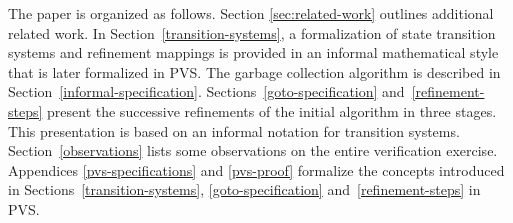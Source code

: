The paper is organized as follows.
Section \ref{sec:related-work} 
outlines additional related work.
In  Section~\ref{transition-systems},  a    formalization of state
transition  systems and  refinement mappings  is  provided in  an informal
mathematical style that  is  later formalized  in  PVS.  The garbage
collection algorithm is described in
Section~\ref{informal-specification}\@.
Sections~\ref{goto-specification} and~\ref{refinement-steps} present
the successive refinements of the initial algorithm in three stages.
This presentation is based on   an informal notation for  transition systems.
Section~\ref{observations} lists some observations on the entire
verification exercise. 
Appendices \ref{pvs-specifications} and \ref{pvs-proof} formalize
the concepts  introduced   in   Sections~\ref{transition-systems},
\ref{goto-specification} and~\ref{refinement-steps} in PVS.   



